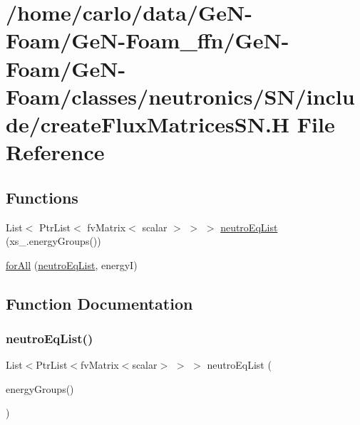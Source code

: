 \hypertarget{createFluxMatricesSN_8H}{}\section{/home/carlo/data/\+Ge\+N-\/\+Foam/\+Ge\+N-\/\+Foam\+\_\+ffn/\+Ge\+N-\/\+Foam/\+Ge\+N-\/\+Foam/classes/neutronics/\+S\+N/include/create\+Flux\+Matrices\+SN.H File Reference}
\label{createFluxMatricesSN_8H}
\subsection*{Functions}
\begin{DoxyCompactItemize}
\item 
List$<$ Ptr\+List$<$ fv\+Matrix$<$ scalar $>$ $>$ $>$ \hyperlink{createFluxMatricesSN_8H_ac22ff3c95f6474a1572aaf38c442976b}{neutro\+Eq\+List} (xs\+\_\+.\+energy\+Groups())
\item 
\hyperlink{createFluxMatricesSN_8H_a519b1e4cdba767eb399a8996a4921b48}{for\+All} (\hyperlink{createFluxMatricesSP3_8H_a1907928561277afa8d206f57c42b8880}{neutro\+Eq\+List}, energyI)
\end{DoxyCompactItemize}


\subsection{Function Documentation}
\mbox{\label{createFluxMatricesSN_8H_ac22ff3c95f6474a1572aaf38c442976b}} 
\subsubsection{\texorpdfstring{neutro\+Eq\+List()}{neutroEqList()}}
{\footnotesize\ttfamily List$<$Ptr\+List$<$fv\+Matrix$<$scalar$>$ $>$ $>$ neutro\+Eq\+List (\begin{DoxyParamCaption}\item[{xs\+\_\+.}]{energy\+Groups() }\end{DoxyParamCaption})}




